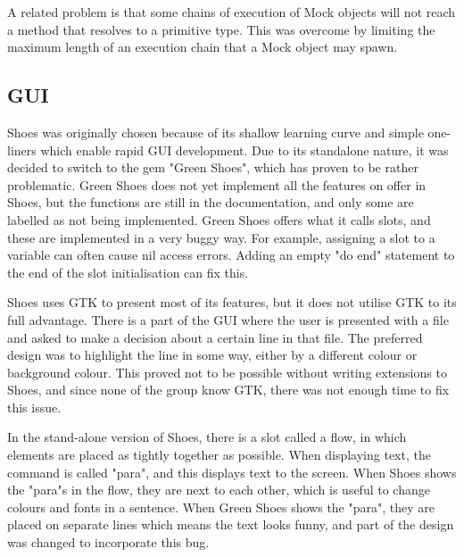     A related problem is that some chains of execution of Mock objects will not
reach a method that resolves to a primitive type. This was overcome by limiting
the maximum length of an execution chain that a Mock object may spawn.

  \subsection{GUI}
    Shoes was originally chosen because of its shallow learning curve and simple one-liners which enable rapid GUI development. Due to its standalone nature, it was decided to switch to the gem "Green Shoes", which has proven to be rather problematic. Green Shoes does not yet implement all the features on offer in Shoes, but the functions are still in the documentation, and only some are labelled as not being implemented. Green Shoes offers what it calls slots, and these are implemented in a very buggy way. For example, assigning a slot to a variable can often cause nil access errors. Adding an empty "do end" statement to the end of the slot initialisation can fix this. 
    
    Shoes uses GTK to present most of its features, but it does not utilise GTK to its full advantage. There is a part of the GUI where the user is presented with a file and asked to make a decision about a certain line in that file. The preferred design was to highlight the line in some way, either by a different colour or background colour. This proved not to be possible without writing extensions to Shoes, and since none of the group know GTK, there was not enough time to fix this issue.
    
    In the stand-alone version of Shoes, there is a slot called a flow, in which elements are placed as tightly together as possible. When displaying text, the command is called "para", and this displays text to the screen. When Shoes shows the "para"s in the flow, they are next to each other, which is useful to change colours and fonts in a sentence. When Green Shoes shows the "para", they are placed on separate lines which means the text looks funny, and part of the design was changed to incorporate this bug.
